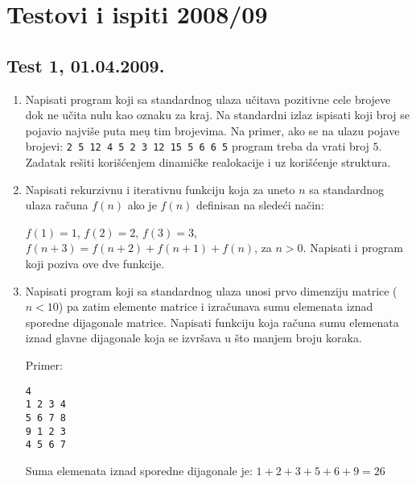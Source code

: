 \chapter{Testovi i ispiti 2008/09}

\newpage

\section{Test 1, 01.04.2009.}


\begin{enumerate}
\item
Napisati program koji sa standardnog ulaza u\v citava pozitivne cele
brojeve dok ne u\v cita nulu kao oznaku za kraj. Na standardni izlaz
ispisati koji broj se pojavio najvi\v se puta me\d u tim brojevima.
Na primer, ako se na ulazu pojave brojevi:
\verb+2 5 12 4 5 2 3 12 15 5 6 6 5+
program treba da vrati broj $5$.
Zadatak re\v siti kori\v{s}\'cenjem dinami\v cke realokacije i uz kori\v s\' cenje struktura.

\item
Napisati rekurzivnu i iterativnu funkciju koja za uneto $n$ sa standardnog ulaza ra\v cuna $f(n)$ ako je $f(n)$ definisan na slede\' ci na\v cin:

$f(1)=1$, $f(2)=2$, $f(3)=3$, $f(n+3)=f(n+2)+f(n+1)+f(n)$, za $n>0$.
Napisati i program koji poziva ove dve funkcije.

\item
Napisati program koji sa standardnog ulaza unosi prvo dimenziju matrice
($n<10$)
pa zatim elemente matrice i izra\v cunava sumu elemenata iznad sporedne
dijagonale matrice.
Napisati funkciju koja ra\v cuna sumu elemenata iznad glavne dijagonale
koja se izvr\v sava u \v sto manjem broju koraka.

Primer:
\begin{verbatim}
4
1 2 3 4
5 6 7 8
9 1 2 3
4 5 6 7
\end{verbatim}

Suma elemenata iznad sporedne dijagonale je: $1+2+3+5+6+9=26$
\end{enumerate}




